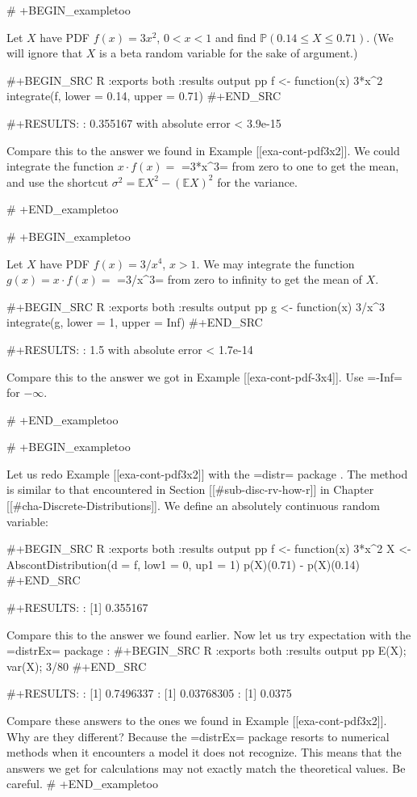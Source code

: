 # +BEGIN_exampletoo

Let \(X\) have PDF \(f(x)=3x^{2}\), \(0<x<1\) and find
\(\mathbb{P}(0.14\leq X\leq0.71)\). (We will ignore that \(X\) is a
beta random variable for the sake of argument.)

#+BEGIN_SRC R :exports both :results output pp 
f <- function(x) 3*x^2
integrate(f, lower = 0.14, upper = 0.71)
#+END_SRC

#+RESULTS:
: 0.355167 with absolute error < 3.9e-15

Compare this to the answer we found in Example [[exa-cont-pdf3x2]]. We could
integrate the function \(x \cdot f(x)=\) =3*x^3= from zero to one to
get the mean, and use the shortcut \(\sigma^{2}=\mathbb{E}
X^{2}-\left(\mathbb{E} X\right)^{2}\) for the variance.

# +END_exampletoo


# +BEGIN_exampletoo

Let \(X\) have PDF \(f(x)=3/x^{4}\), \(x>1\). We may integrate the
function \(g(x) = x \cdot f(x)=\) =3/x^3= from zero to infinity to get
the mean of \(X\).

#+BEGIN_SRC R :exports both :results output pp 
g <- function(x) 3/x^3
integrate(g, lower = 1, upper = Inf)
#+END_SRC

#+RESULTS:
: 1.5 with absolute error < 1.7e-14

Compare this to the answer we got in Example [[exa-cont-pdf-3x4]]. Use =-Inf=
for \(-\infty\).

# +END_exampletoo


# +BEGIN_exampletoo

Let us redo Example [[exa-cont-pdf3x2]] with the =distr= package
\cite{distr}. The method is similar to that encountered in Section
[[#sub-disc-rv-how-r]] in Chapter [[#cha-Discrete-Distributions]]. We define an
absolutely continuous random variable:

#+BEGIN_SRC R :exports both :results output pp
f <- function(x) 3*x^2
X <- AbscontDistribution(d = f, low1 = 0, up1 = 1)
p(X)(0.71) - p(X)(0.14)
#+END_SRC

#+RESULTS:
: [1] 0.355167

Compare this to the answer we found earlier. Now let us try
expectation with the =distrEx= package \cite{distrEx}:
#+BEGIN_SRC R :exports both :results output pp 
E(X); var(X); 3/80
#+END_SRC

#+RESULTS:
: [1] 0.7496337
: [1] 0.03768305
: [1] 0.0375

Compare these answers to the ones we found in Example [[exa-cont-pdf3x2]]. Why
are they different? Because the =distrEx= package resorts to numerical
methods when it encounters a model it does not recognize. This means
that the answers we get for calculations may not exactly match the
theoretical values. Be careful.
# +END_exampletoo

